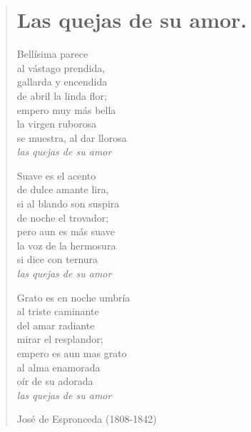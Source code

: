 \documentclass[12pt, twoside]{book}
\begin{document}
\newpage
\begin{verse}
\begin{center}
\section{Las quejas de su amor.}
\end{center}
Bellísima parece\\
al vástago prendida,\\
gallarda y encendida\\
de abril la linda flor;\\
empero muy más bella\\
la virgen ruborosa\\
se muestra, al dar llorosa\\
\textit{las quejas de su amor}
\newline

Suave es el acento\\
de dulce amante lira,\\
si al blando son suspira\\
de noche el trovador;\\
pero aun es más suave\\
la voz de la hermosura\\
si dice con ternura\\
\textit{las quejas de su amor}
\newline

Grato es en noche umbría\\
al triste caminante\\
del amar radiante\\
mirar el resplandor;\\
empero es aun mas grato\\
al alma enamorada\\
oír de su adorada\\
\textit{las quejas de su amor}
\newline

José de Espronceda (1808-1842)
\end{verse}
\end{document}
